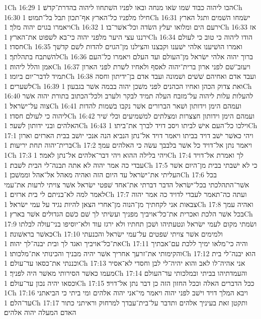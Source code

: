 1Ch 16:29  הבו ליהוה כבוד שׁמו שׂאו מנחה ובאו לפניו השׁתחוו ליהוה בהדרת־קדשׁ׃
1Ch 16:30  חילו מלפניו כל־הארץ אף־תכון תבל בל־תמוט׃
1Ch 16:31  ישׂמחו השׁמים ותגל הארץ ויאמרו בגוים יהוה מלך׃
1Ch 16:32  ירעם הים ומלואו יעלץ השׂדה וכל־אשׁר־בו׃
1Ch 16:33  אז ירננו עצי היער מלפני יהוה כי־בא לשׁפוט את־הארץ׃
1Ch 16:34  הודו ליהוה כי טוב כי לעולם חסדו׃
1Ch 16:35  ואמרו הושׁיענו אלהי ישׁענו וקבצנו והצילנו מן־הגוים להדות לשׁם קדשׁך להשׁתבח בתהלתך׃
1Ch 16:36  ברוך יהוה אלהי ישׂראל מן־העולם ועד העלם ויאמרו כל־העם אמן והלל ליהוה׃
1Ch 16:37  ויעזב־שׁם לפני ארון ברית־יהוה לאסף ולאחיו לשׁרת לפני הארון תמיד לדבר־יום ביומו׃
1Ch 16:38  ועבד אדם ואחיהם שׁשׁים ושׁמונה ועבד אדם בן־ידיתון וחסה לשׁערים׃
1Ch 16:39  ואת צדוק הכהן ואחיו הכהנים לפני משׁכן יהוה בבמה אשׁר בגבעון׃
1Ch 16:40  להעלות עלות ליהוה על־מזבח העלה תמיד לבקר ולערב ולכל־הכתוב בתורת יהוה אשׁר צוה על־ישׂראל׃
1Ch 16:41  ועמהם הימן וידותון ושׁאר הברורים אשׁר נקבו בשׁמות להדות ליהוה כי לעולם חסדו׃
1Ch 16:42  ועמהם הימן וידותון חצצרות ומצלתים למשׁמיעים וכלי שׁיר האלהים ובני ידותון לשׁער׃
1Ch 16:43  וילכו כל־העם אישׁ לביתו ויסב דויד לברך את־ביתו׃
1Ch 17:1  ויהי כאשׁר ישׁב דויד בביתו ויאמר דויד אל־נתן הנביא הנה אנכי יושׁב בבית הארזים וארון ברית־יהוה תחת יריעות׃
1Ch 17:2  ויאמר נתן אל־דויד כל אשׁר בלבבך עשׂה כי האלהים עמך׃
1Ch 17:3  ויהי בלילה ההוא ויהי דבר־אלהים אל־נתן לאמר׃
1Ch 17:4  לך ואמרת אל־דויד עבדי כה אמר יהוה לא אתה תבנה־לי הבית לשׁבת׃
1Ch 17:5  כי לא ישׁבתי בבית מן־היום אשׁר העליתי את־ישׂראל עד היום הזה ואהיה מאהל אל־אהל וממשׁכן׃
1Ch 17:6  בכל אשׁר־התהלכתי בכל־ישׂראל הדבר דברתי את־אחד שׁפטי ישׂראל אשׁר צויתי לרעות את־עמי לאמר למה לא־בניתם לי בית ארזים׃
1Ch 17:7  ועתה כה־תאמר לעבדי לדויד כה אמר יהוה צבאות אני לקחתיך מן־הנוה מן־אחרי הצאן להיות נגיד על עמי ישׂראל׃
1Ch 17:8  ואהיה עמך בכל אשׁר הלכת ואכרית את־כל־אויביך מפניך ועשׂיתי לך שׁם כשׁם הגדולים אשׁר בארץ׃
1Ch 17:9  ושׂמתי מקום לעמי ישׂראל ונטעתיהו ושׁכן תחתיו ולא ירגז עוד ולא־יוסיפו בני־עולה לבלתו כאשׁר בראשׁונה׃
1Ch 17:10  ולמימים אשׁר צויתי שׁפטים על־עמי ישׂראל והכנעתי את־כל־אויביך ואגד לך ובית יבנה־לך יהוה׃
1Ch 17:11  והיה כי־מלאו ימיך ללכת עם־אבתיך והקימותי את־זרעך אחריך אשׁר יהיה מבניך והכינותי את־מלכותו׃
1Ch 17:12  הוא יבנה־לי בית וכננתי את־כסאו עד־עולם׃
1Ch 17:13  אני אהיה־לו לאב והוא יהיה־לי לבן וחסדי לא־אסיר מעמו כאשׁר הסירותי מאשׁר היה לפניך׃
1Ch 17:14  והעמדתיהו בביתי ובמלכותי עד־העולם וכסאו יהיה נכון עד־עולם׃
1Ch 17:15  ככל הדברים האלה וככל החזון הזה כן דבר נתן אל־דויד׃
1Ch 17:16  ויבא המלך דויד וישׁב לפני יהוה ויאמר מי־אני יהוה אלהים ומי ביתי כי הביאתני עד־הלם׃
1Ch 17:17  ותקטן זאת בעיניך אלהים ותדבר על־בית־עבדך למרחוק וראיתני כתור האדם המעלה יהוה אלהים׃
